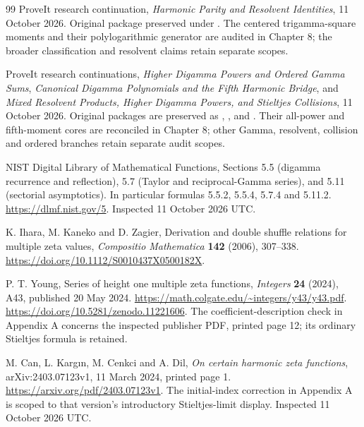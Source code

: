 \begin{thebibliography}{99}
ProveIt research continuation, \emph{Harmonic Parity and Resolvent Identities}, 11 October 2026. Original package preserved under . The centered trigamma-square moments and their polylogarithmic generator are audited in Chapter 8; the broader classification and resolvent claims retain separate scopes.


ProveIt research continuations, \emph{Higher Digamma Powers and Ordered Gamma Sums},
\emph{Canonical Digamma Polynomials and the Fifth Harmonic Bridge}, and
\emph{Mixed Resolvent Products, Higher Digamma Powers, and Stieltjes Collisions},
11 October 2026. Original packages are preserved as
,
,
and .
Their all-power and fifth-moment cores are reconciled in Chapter 8; other
Gamma, resolvent, collision and ordered branches retain separate audit scopes.

NIST Digital Library of Mathematical Functions, Sections 5.5 (digamma
recurrence and reflection), 5.7 (Taylor and reciprocal-Gamma series), and
5.11 (sectorial asymptotics). In particular formulas 5.5.2, 5.5.4, 5.7.4
and 5.11.2. \url{https://dlmf.nist.gov/5}. Inspected 11 October 2026 UTC.

K. Ihara, M. Kaneko and D. Zagier, Derivation and double shuffle relations
for multiple zeta values, \emph{Compositio Mathematica} \textbf{142} (2006),
307--338. \url{https://doi.org/10.1112/S0010437X0500182X}.

P. T. Young, Series of height one multiple zeta functions, \emph{Integers}
\textbf{24} (2024), A43, published 20 May 2024.
\url{https://math.colgate.edu/~integers/y43/y43.pdf}.
\url{https://doi.org/10.5281/zenodo.11221606}.
The coefficient-description check in Appendix A concerns the inspected
publisher PDF, printed page 12; its ordinary Stieltjes formula is retained.

M. Can, L. Karg\i n, M. Cenkci and A. Dil, \emph{On certain harmonic zeta
functions}, arXiv:2403.07123v1, 11 March 2024, printed page 1.
\url{https://arxiv.org/pdf/2403.07123v1}.
The initial-index correction in Appendix A is scoped to that version's
introductory Stieltjes-limit display. Inspected 11 October 2026 UTC.



\end{thebibliography}
